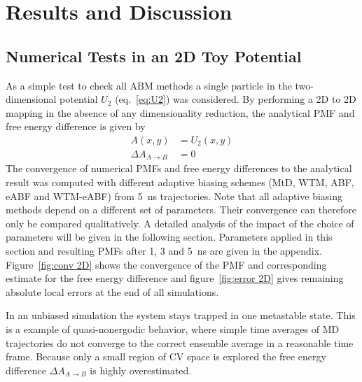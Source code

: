 \chapter{Results and Discussion}
\label{cha:results}

\section{Numerical Tests in an 2D Toy Potential}
\label{sec:2D}
As a simple test to check all ABM methods a single particle in the two-dimensional potential $U_2$ (eq.~\ref{eq:U2}) was considered.
By performing a 2D to 2D mapping in the absence of any dimensionality reduction, the analytical PMF and free energy difference is given by
\begin{equation}
  \begin{split}
    A(x,y)&=U_2(x,y) \\
    \Delta A_{A\to B} &= 0
  \end{split}
\end{equation}
The convergence of numerical PMFs and free energy differences to the analytical result was computed with different adaptive biasing schemes (MtD, WTM, ABF, eABF and WTM-eABF) from 5~ns trajectories.
Note that all adaptive biasing methods depend on a different set of parameters.
Their convergence can therefore only be compared qualitatively.
A detailed analysis of the impact of the choice of parameters will be given in the following section.
Parameters applied in this section and resulting PMFs after 1, 3 and 5~ns are given in the appendix.
Figure~\ref{fig:conv 2D} shows the convergence of the PMF and corresponding estimate for the free energy difference and figure~\ref{fig:error 2D} gives remaining absolute local errors at the end of all simulations.

In an unbiased simulation the system stays trapped in one metastable state.
This is a example of quasi-nonergodic behavior, where simple time averages of MD trajectories do not converge to the correct ensemble average in a reasonable time frame.
Because only a small region of CV space is explored the free energy difference $\Delta A_{A\to B}$ is highly overestimated.

